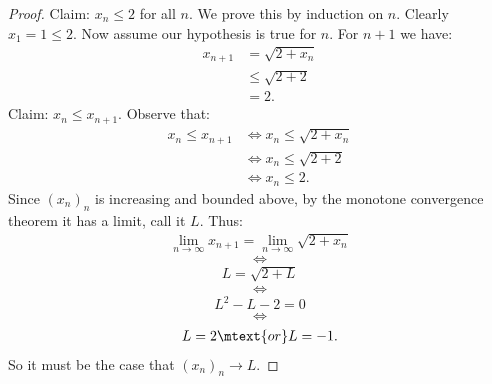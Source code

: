 \documentclass[10pt,twoside,openany]{memoir}
\begin{document}
        \begin{proof}
            Claim: $x_n \leq 2$ for all $n$. We prove this by induction on $n$. Clearly $x_1 = 1 \leq 2$. Now assume our hypothesis is true for $n$. For $n+1$ we have:
                \begin{equation*}
                \begin{split}
                    x_{n+1}
                    & = \sqrt{2 + x_n} \\
                    & \leq \sqrt{2 + 2} \\
                    & = 2.
                \end{split}
                \end{equation*}
            Claim: $x_n \leq x_{n+1}$. Observe that:
                \begin{equation*}
                \begin{split}
                    x_n \leq x_{n+1}
                    & \iff x_n \leq \sqrt{2 + x_n} \\
                    & \iff x_n \leq \sqrt{2 + 2} \\
                    & \iff x_n \leq 2.
                \end{split}
                \end{equation*}
            Since $(x_n)_n$ is increasing and bounded above, by the monotone convergence theorem it has a limit, call it $L$. Thus:
                \begin{equation*}
                \begin{split}
                    \lim_{n \rightarrow \infty}x_{n+1} = \lim_{n \rightarrow \infty}\sqrt{2 + x_n}
                \end{split}
                \end{equation*}
                $$\iff$$
                \begin{equation*}
                \begin{split}
                    L = \sqrt{2 + L}
                \end{split}
                \end{equation*}
                $$\iff$$
                \begin{equation*}
                \begin{split}
                    L^2 - L - 2 = 0
                \end{split}
                \end{equation*}
                $$\iff$$
                \begin{equation*}
                \begin{split}
                    L = 2 \mtext{or} L =-1.
                \end{split}
                \end{equation*}
            So it must be the case that $(x_n)_n \rightarrow L$.
        \end{proof}
\end{document}
